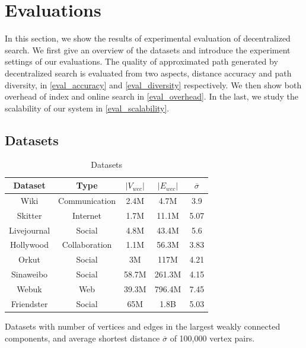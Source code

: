 \section{Evaluations}
\label{evaluation}

In this section, we show the results of experimental evaluation of decentralized search. We first give an overview of the datasets and introduce the experiment settings of our evaluations. The quality of approximated path generated by decentralized search is evaluated from two aspects, distance accuracy and path diversity, in \ref{eval_accuracy} and \ref{eval_diversity} respectively. We then show both overhead of index and online search in \ref{eval_overhead}. In the last, we study the scalability of our system in \ref{eval_scalability}.

\subsection{Datasets}
\label{eval_datasets}

\begin{table}
		\caption{Datasets}
		\vspace{2 mm}
		\label{table:datasets}
		\begin{threeparttable}
			\centering
			\begin{tabular}{c|cccc} \hline
				Dataset & Type & $|V_{wcc}|$ & $|E_{wcc}|$ & $\overline{\sigma}$ \\ \hline
				Wiki & Communication & 2.4M & 4.7M & 3.9 \\ 
				Skitter & Internet & 1.7M & 11.1M & 5.07 \\ 
				Livejournal & Social & 4.8M & 43.4M & 5.6 \\ 
				Hollywood & Collaboration & 1.1M & 56.3M & 3.83 \\ 
				Orkut & Social & 3M & 117M & 4.21 \\ 
				Sinaweibo & Social & 58.7M & 261.3M & 4.15 \\ 
				Webuk & Web & 39.3M & 796.4M & 7.45 \\ 
				Friendster & Social & 65M & 1.8B & 5.03 \\ \hline
			\end{tabular}
			\begin{tablenotes}
				\item Datasets with number of vertices and edges in the largest weakly connected components, and average shortest distance $\overline{\sigma}$ of 100,000 vertex pairs.
			\end{tablenotes}
		\end{threeparttable}
\end{table}

